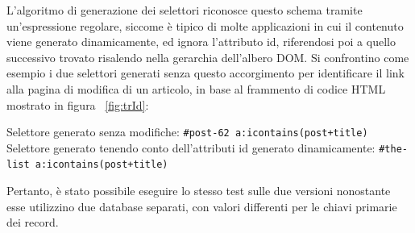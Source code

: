 L'algoritmo di generazione dei selettori riconosce questo schema tramite un'espressione regolare, siccome è tipico di molte applicazioni in cui il contenuto viene generato dinamicamente, ed ignora l'attributo id, riferendosi poi a quello successivo trovato risalendo nella gerarchia dell'albero DOM. Si confrontino come esempio i due selettori generati senza questo accorgimento per identificare il link alla pagina di modifica di un articolo, in base al frammento di codice HTML mostrato in figura ~\ref{fig:trId}:

Selettore generato senza modifiche:  \verb|#post-62 a:icontains(post+title)| 
\newline
Selettore generato tenendo conto dell'attributi id generato dinamicamente: \newline \verb|#the-list a:icontains(post+title)| 

Pertanto, è stato possibile eseguire lo stesso test sulle due versioni nonostante esse utilizzino due database separati, con valori differenti per le chiavi primarie dei record.